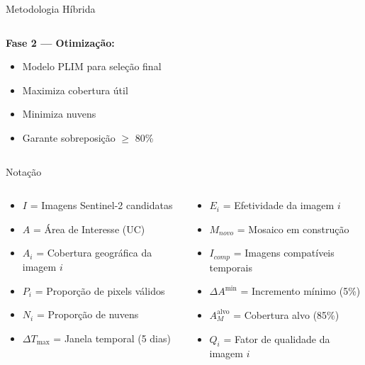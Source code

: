 \documentclass[aspectratio=169,11pt]{beamer}
\begin{document}
\begin{frame}{Metodologia Híbrida}
\begin{center}
\begin{columns}[c]
\begin{column}{0.7\textwidth}
        \vspace{0.3cm}
        \textbf{Fase 2 --- Otimização:}
        \begin{itemize}
            \item Modelo PLIM para seleção final
            \item Maximiza cobertura útil
            \item Minimiza nuvens
            \item Garante sobreposição $\geq$ 80\%
        \end{itemize}
    \end{column}
\end{columns}
\end{center}
\end{frame}

\begin{frame}{Notação}
\vspace{-0.2cm}
\begin{columns}[T]
    \begin{column}{0.48\textwidth}
        \begin{itemize}
            \item $I$ = Imagens Sentinel-2 candidatas
            \item $A$ = Área de Interesse (UC)
            \item $A_i$ = Cobertura geográfica da imagem $i$
            \item $P_i$ = Proporção de pixels válidos
            \item $N_i$ = Proporção de nuvens
            \item $\Delta T_{\max}$ = Janela temporal (5 dias)
        \end{itemize}
    \end{column}
    \begin{column}{0.48\textwidth}
        \begin{itemize}
            \item $E_i$ = Efetividade da imagem $i$
            \item $M_{novo}$ = Mosaico em construção
            \item $I_{comp}$ = Imagens compatíveis temporais
            \item $\Delta A^{\min}$ = Incremento mínimo (5\%)
            \item $A_M^{\text{alvo}}$ = Cobertura alvo (85\%)
            \item $Q_i$ = Fator de qualidade da imagem $i$
        \end{itemize}
    \end{column}
\end{columns}
\end{frame}
\end{document}

